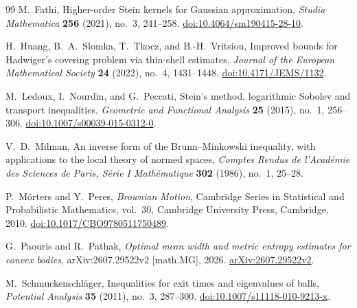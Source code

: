 \documentclass[11pt]{amsart}
\numberwithin{equation}{section}
\theoremstyle{definition}
\theoremstyle{remark}
\begin{document}
\begin{thebibliography}{99}
M.~Fathi,
Higher-order Stein kernels for Gaussian approximation,
\emph{Studia Mathematica} \textbf{256} (2021), no.~3,
241--258.
\href{https://doi.org/10.4064/sm190415-28-10}
{doi:10.4064/sm190415-28-10}.

H.~Huang, B.~A.~Slomka, T.~Tkocz, and B.-H.~Vritsiou,
Improved bounds for Hadwiger's covering problem via thin-shell estimates,
\emph{Journal of the European Mathematical Society}
\textbf{24} (2022), no.~4, 1431--1448.
\href{https://doi.org/10.4171/JEMS/1132}{doi:10.4171/JEMS/1132}.

M.~Ledoux, I.~Nourdin, and G.~Peccati,
Stein's method, logarithmic Sobolev and transport inequalities,
\emph{Geometric and Functional Analysis} \textbf{25} (2015), no.~1, 256--306.
\href{https://doi.org/10.1007/s00039-015-0312-0}
{doi:10.1007/s00039-015-0312-0}.

V.~D.~Milman,
An inverse form of the Brunn--Minkowski inequality, with applications
to the local theory of normed spaces,
\emph{Comptes Rendus de l'Acad\'emie des Sciences de Paris,
S\'erie I Math\'ematique} \textbf{302} (1986), no.~1,
25--28.

P.~M\"orters and Y.~Peres,
\emph{Brownian Motion},
Cambridge Series in Statistical and Probabilistic Mathematics,
vol.~30, Cambridge University Press, Cambridge, 2010.
\href{https://doi.org/10.1017/CBO9780511750489}
{doi:10.1017/CBO9780511750489}.

G.~Paouris and R.~Pathak,
\emph{Optimal mean width and metric entropy estimates for convex bodies},
arXiv:2607.29522v2 [math.MG], 2026.
\href{https://arxiv.org/abs/2607.29522v2}{arXiv:2607.29522v2}.

M.~Schmuckenschl\"ager,
Inequalities for exit times and eigenvalues of balls,
\emph{Potential Analysis} \textbf{35} (2011), no.~3, 287--300.
\href{https://doi.org/10.1007/s11118-010-9213-x}
{doi:10.1007/s11118-010-9213-x}.

\end{thebibliography}
\end{document}
